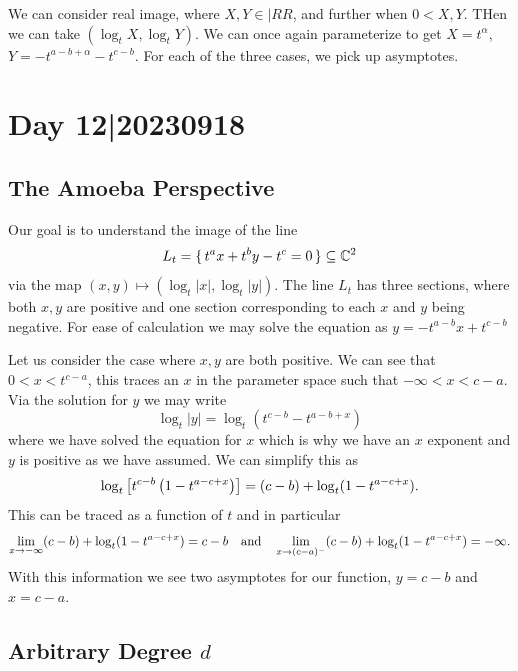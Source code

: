 \documentclass[12pt]{memoir}
\theoremstyle{definition}
\begin{document}
We can consider real image, where $X,Y \in |RR$, and further when $0< X,Y$. THen we can take $(\log_tX,\log_tY)$. We can once again parameterize to get $X= t^\alpha$, $Y = -t^{a-b+\alpha} -t^{c-b}$.  For each of the three cases, we pick up asymptotes.




\section{Day 12|20230918}

\subsection{The Amoeba Perspective}%

Our goal is to understand the image of the line 
$$L_t=\{\,t^ax+t^by-t^c=0\,\}\subseteq\mathbb{C}^2$$
via the map $(x,y)\mapsto (\log_t|x|,\log_t|y|)$. The line $L_t$ has three sections, where both $x,y$ are positive and one section corresponding to each $x$ and $y$ being negative. For ease of calculation we may solve the equation as $y=-t^{a-b}x+t^{c-b}$\par 
Let us consider the case where $x,y$ are both positive. We can see that $0<x<t^{c-a}$, this traces an $x$ in the parameter space such that $-\infty<x<c-a$. Via the solution for $y$ we may write 
$$\log_t|y|=\log_t(t^{c-b}-t^{a-b+x})$$
where we have solved the equation for $x$ which is why we have an $x$ exponent and $y$ is positive as we have assumed. We can simplify this as 
$$\log_t\left\lbrack t^{c-b}\left(1-t^{a-c+x}\right)\right\rbrack=(c-b)+\log_t(1-t^{a-c+x}).$$
This can be traced as a function of $t$ and in particular
$$\lim_{x\to-\infty}(c-b)+\log_t(1-t^{a-c+x})=c-b\quad\text{and}\quad\lim_{x\to(c-a)^{-}}(c-b)+\log_t(1-t^{a-c+x})=-\infty.$$
With this information we see two asymptotes for our function, $y=c-b$ and $x=c-a$.

\subsection{Arbitrary Degree $d$}
\end{document}
